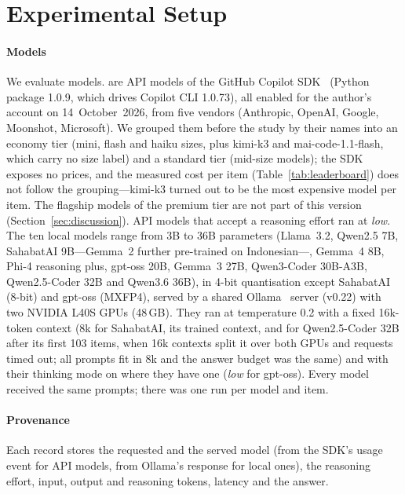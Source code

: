 \section{Experimental Setup}
\label{sec:setup}

\paragraph{Models} We evaluate \NModels{} models. \NApi{} are API models of the GitHub Copilot SDK~\cite{copilotsdk2026} (Python package 1.0.9, which drives Copilot CLI 1.0.73), all enabled for the author's account on 14~October~2026, from five vendors (Anthropic, OpenAI, Google, Moonshot, Microsoft). We grouped them before the study by their names into an economy tier (mini, flash and haiku sizes, plus kimi-k3 and mai-code-1.1-flash, which carry no size label) and a standard tier (mid-size models); the SDK exposes no prices, and the measured cost per item (Table~\ref{tab:leaderboard}) does not follow the grouping---kimi-k3 turned out to be the most expensive model per item. The \NPremium{} flagship models of the premium tier are not part of this version (Section~\ref{sec:discussion}). API models that accept a reasoning effort ran at \emph{low}. The ten local models range from 3B to 36B parameters (Llama~3.2, Qwen2.5 7B, SahabatAI 9B---Gemma~2 further pre-trained on Indonesian---, Gemma~4 8B, Phi-4 reasoning plus, gpt-oss 20B, Gemma~3 27B, Qwen3-Coder 30B-A3B, Qwen2.5-Coder 32B and Qwen3.6 36B), in 4-bit quantisation except SahabatAI (8-bit) and gpt-oss (MXFP4), served by a shared Ollama~\cite{ollama} server (v0.22) with two NVIDIA L40S GPUs (48\,GB). They ran at temperature 0.2 with a fixed 16k-token context (8k for SahabatAI, its trained context, and for Qwen2.5-Coder 32B after its first 103 items, when 16k contexts split it over both GPUs and requests timed out; all prompts fit in 8k and the answer budget was the same) and with their thinking mode on where they have one (\emph{low} for gpt-oss). Every model received the same prompts; there was one run per model and item.

\paragraph{Provenance} Each record stores the requested and the served model (from the SDK's usage event for API models, from Ollama's response for local ones), the reasoning effort, input, output and reasoning tokens, latency and the answer.

